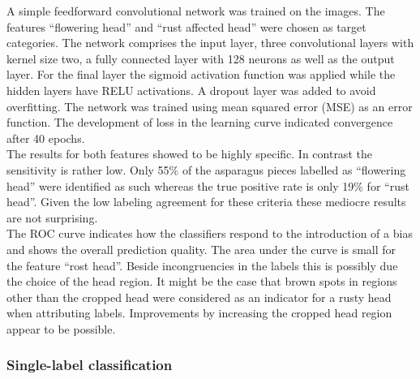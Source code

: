 A simple feedforward convolutional network was trained on the images. The features “flowering head” and “rust affected head” were chosen as target categories. The network comprises the input layer, three convolutional layers with kernel size two, a fully connected layer with 128 neurons as well as the output layer. For the final layer the sigmoid activation function was applied while the hidden layers have RELU activations. A dropout layer was added to avoid overfitting. The network was trained using mean squared error (MSE) as an error function. The development of loss in the learning curve indicated convergence after 40 epochs. \\
The results for both features showed to be highly specific. In contrast the sensitivity is rather low. Only 55\% of the asparagus pieces labelled as “flowering head” were identified as such whereas the true positive rate is only 19\% for “rust head”. Given the low labeling agreement for these criteria these mediocre results are not surprising. \\
The ROC curve indicates how the classifiers respond to the introduction of a bias and shows the overall prediction quality. The area under the curve is small for the feature “rost head”. Beside incongruencies in the labels this is possibly due the choice of the head region. It might be the case that brown spots in regions other than the cropped head were considered as an indicator for a rusty head when attributing labels. Improvements by increasing the cropped head region appear to be possible. \\


\subsubsection{Single-label classification}
\label{subsec:SingleLabel}

